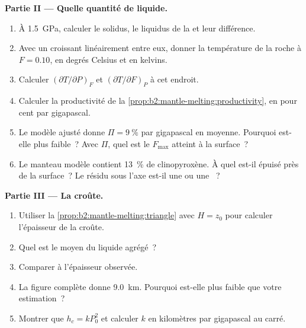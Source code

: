\begin{problem}
\noindent\textbf{Partie II --- Quelle quantité de liquide.}
\begin{enumerate}[resume]
\item À \qty{1.5}{GPa}, calculer le solidus, le liquidus de la  et leur
différence.
\item Avec un  croissant linéairement entre eux, donner la température de
la roche à $F = 0.10$, en degrés Celsius et en kelvins.
\item Calculer $(\partial T/\partial P)_F$ et $(\partial T/\partial F)_P$ à cet endroit.
\item Calculer la productivité de la \cref{prop:b2:mantle-melting:productivity}, en
pour cent par gigapascal.
\item Le modèle ajusté donne $\Pi = \qty{9}{\percent}$ par gigapascal en moyenne.
Pourquoi est-elle plus faible~? Avec $\Pi$, quel est le  $F_{\max}$ atteint à la
surface~?
\item Le manteau modèle contient \qty{13}{\percent} de clinopyroxène. À quel  est-il épuisé près de la surface~? Le résidu sous l'axe est-il une
 ou une ~?
\end{enumerate}

\noindent\textbf{Partie III --- La croûte.}
\begin{enumerate}[resume]
\item Utiliser la \cref{prop:b2:mantle-melting:triangle} avec $H = z_0$ pour calculer
l'épaisseur de la croûte.
\item Quel est le  moyen du liquide agrégé~?
\item Comparer à l'épaisseur observée.
\item La figure complète donne \qty{9.0}{km}. Pourquoi est-elle plus faible que
votre estimation~?
\item Montrer que $h_c = k P_0^2$ et calculer $k$ en kilomètres par gigapascal
au carré.
\end{enumerate}


\end{problem}

